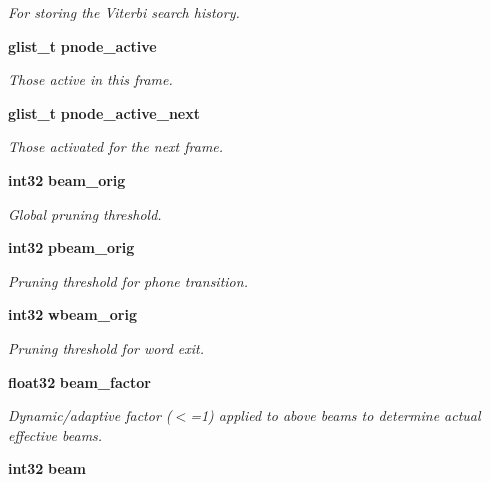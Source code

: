 \begin{DoxyCompactItemize}
\begin{DoxyCompactList}\small\item\em \-For storing the \-Viterbi search history. \end{DoxyCompactList}\item 
{\bf glist\-\_\-t} {\bf pnode\-\_\-active}\label{structfsg__search__s_a318ff42978c1e645f01962345ac08215}

\begin{DoxyCompactList}\small\item\em \-Those active in this frame. \end{DoxyCompactList}\item 
{\bf glist\-\_\-t} {\bf pnode\-\_\-active\-\_\-next}\label{structfsg__search__s_aa2dfc00e1f34041dacd9572b0d659775}

\begin{DoxyCompactList}\small\item\em \-Those activated for the next frame. \end{DoxyCompactList}\item 
{\bf int32} {\bf beam\-\_\-orig}\label{structfsg__search__s_a0cdf7dc3d3eed0d37f46cb71fdea206e}

\begin{DoxyCompactList}\small\item\em \-Global pruning threshold. \end{DoxyCompactList}\item 
{\bf int32} {\bf pbeam\-\_\-orig}\label{structfsg__search__s_a7cdf0ab2591b95d89940d51e3ab01529}

\begin{DoxyCompactList}\small\item\em \-Pruning threshold for phone transition. \end{DoxyCompactList}\item 
{\bf int32} {\bf wbeam\-\_\-orig}\label{structfsg__search__s_a7f3ecc2f769143e42ed958744478db3c}

\begin{DoxyCompactList}\small\item\em \-Pruning threshold for word exit. \end{DoxyCompactList}\item 
{\bf float32} {\bf beam\-\_\-factor}
\begin{DoxyCompactList}\small\item\em \-Dynamic/adaptive factor ($<$=1) applied to above beams to determine actual effective beams. \end{DoxyCompactList}\item 
{\bf int32} {\bfseries beam}\label{structfsg__search__s_a1dbc28682f610fef5b79fd8a182f4395}


\end{DoxyCompactItemize}
